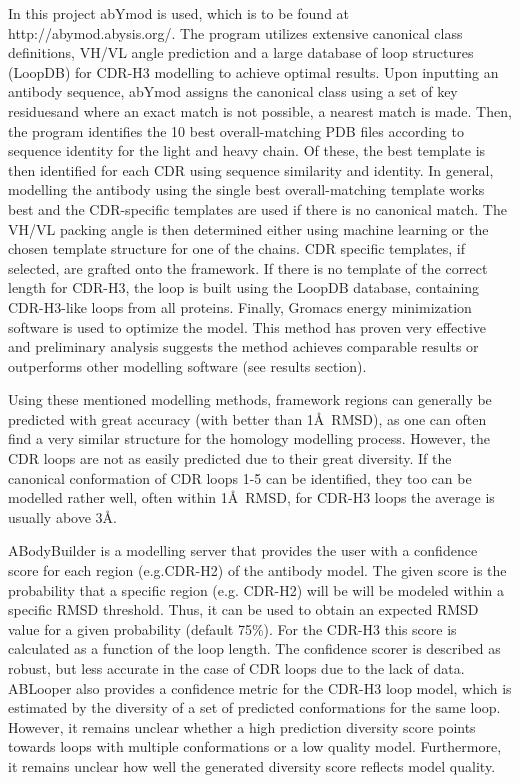 \documentclass[12pt]{article}
\begin{document}
In this project abYmod is used, which is to be found at
http://abymod.abysis.org/. The program utilizes extensive canonical
class definitions, VH/VL angle prediction and a large database of loop
structures (LoopDB) for CDR-H3 modelling to achieve optimal
results. Upon inputting an antibody sequence, abYmod assigns the
canonical class using a set of key residues\cite{Martin1996}and where
an exact match is not possible, a nearest match is made. Then, the
program identifies the 10 best overall-matching PDB files according to
sequence identity for the light and heavy chain. Of these, the best
template is then identified for each CDR using sequence similarity and
identity. In general, modelling the antibody using the single best
overall-matching template works best and the CDR-specific templates
are used if there is no canonical match. The VH/VL packing angle is
then determined either using machine learning or the chosen template
structure for one of the chains. CDR specific templates, if selected,
are grafted onto the framework. If there is no template of the correct
length for CDR-H3, the loop is built using the LoopDB database,
containing CDR-H3-like loops from all proteins. Finally, Gromacs energy
minimization software is used to optimize the model. This method has
proven very effective and preliminary analysis suggests the method
achieves comparable results or outperforms other modelling software
(see results section).

Using these mentioned modelling methods, framework regions can
generally be predicted with great accuracy (with better than 1\AA\
RMSD\cite{Almagro2014}), as one can often find a very similar
structure for the homology modelling process.  However, the CDR loops
are not as easily predicted due to their great diversity. If the
canonical conformation of CDR loops 1-5 can be identified, they too
can be modelled rather well, often within 1\AA\ RMSD, for CDR-H3 loops
the average is usually above 3\AA\cite{Almagro2011}.

ABodyBuilder is a modelling server that provides the user with a
confidence score for each region (e.g.CDR-H2) of the antibody
model. The given score is the probability that a specific region
(e.g. CDR-H2) will be will be modeled within a specific RMSD threshold\cite{Leem2016}. Thus, it can be used to obtain an expected RMSD
value for a given probability (default 75\%). For the CDR-H3 this
score is calculated as a function of the loop length.  The confidence
scorer is described as robust, but less accurate in the case of CDR
loops due to the lack of data\cite{Leem2016}. ABLooper also provides a
confidence metric for the CDR-H3 loop model, which is estimated by the
diversity of a set of predicted conformations for the same
loop\cite{Abanades2022}. However, it remains unclear whether a high
prediction diversity score points towards loops with multiple
conformations or a low quality model. Furthermore, it remains unclear
how well the generated diversity score reflects model
quality\cite{Abanades2022}.
\end{document}

